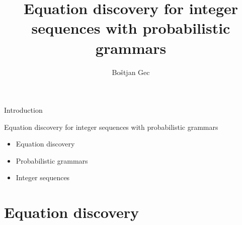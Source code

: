 \documentclass[t,usenames,dvipsnames]{beamer} %
\title{Equation discovery for integer sequences with probabilistic grammars}
\author{Boštjan Gec}
\institute{mentor: prof. dr. Ljupčo Todorovski}
\newcommand{\1}{\boldsymbol{1}}
\newcommand{\0}{\boldsymbol{0}}
\begin{document}
\begin{frame}
  \maketitle
\end{frame}



\begin{frame}{Introduction}
\begin{block}{Equation discovery for integer sequences with probabilistic grammars}
\begin{itemize}
	\item Equation discovery
	\item Probabilistic grammars
	\item Integer sequences
\end{itemize}
\end{block}
\end{frame}

\section{Equation discovery}

\end{document}

